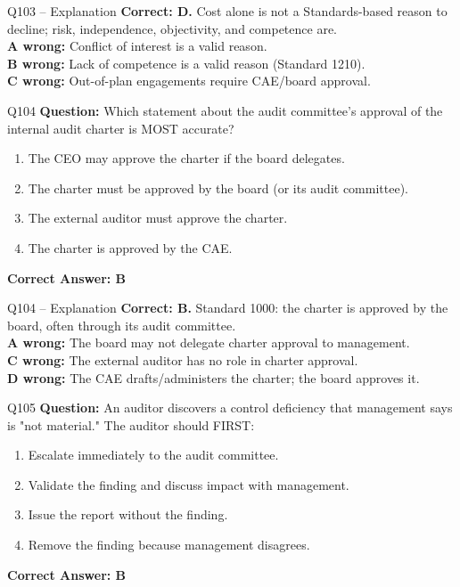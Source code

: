 \documentclass[aspectratio=169,10pt]{beamer}
\begin{document}
	\begin{frame}[t]{Q103 -- Explanation}
		\small
		\textbf{Correct: D.} Cost alone is not a Standards-based reason to decline; risk, independence, objectivity, and competence are. \\[4pt]
		\textbf{A wrong:} Conflict of interest is a valid reason. \\[2pt]
		\textbf{B wrong:} Lack of competence is a valid reason (Standard 1210). \\[2pt]
		\textbf{C wrong:} Out-of-plan engagements require CAE/board approval.
	\end{frame}
	
	\begin{frame}[t]{Q104}
		\small
		\textbf{Question:} Which statement about the audit committee's approval of the internal audit charter is MOST accurate?
		\begin{enumerate}[label=\Alph*.,itemsep=1pt,topsep=2pt]
			\item The CEO may approve the charter if the board delegates.
			\item The charter must be approved by the board (or its audit committee).
			\item The external auditor must approve the charter.
			\item The charter is approved by the CAE.
		\end{enumerate}
		\vspace{4pt}
		\textbf{Correct Answer: B}
	\end{frame}
	
	\begin{frame}[t]{Q104 -- Explanation}
		\small
		\textbf{Correct: B.} Standard 1000: the charter is approved by the board, often through its audit committee. \\[4pt]
		\textbf{A wrong:} The board may not delegate charter approval to management. \\[2pt]
		\textbf{C wrong:} The external auditor has no role in charter approval. \\[2pt]
		\textbf{D wrong:} The CAE drafts/administers the charter; the board approves it.
	\end{frame}
	
	\begin{frame}[t]{Q105}
		\small
		\textbf{Question:} An auditor discovers a control deficiency that management says is "not material." The auditor should FIRST:
		\begin{enumerate}[label=\Alph*.,itemsep=1pt,topsep=2pt]
			\item Escalate immediately to the audit committee.
			\item Validate the finding and discuss impact with management.
			\item Issue the report without the finding.
			\item Remove the finding because management disagrees.
		\end{enumerate}
		\vspace{4pt}
		\textbf{Correct Answer: B}
	\end{frame}
	
\end{document}
